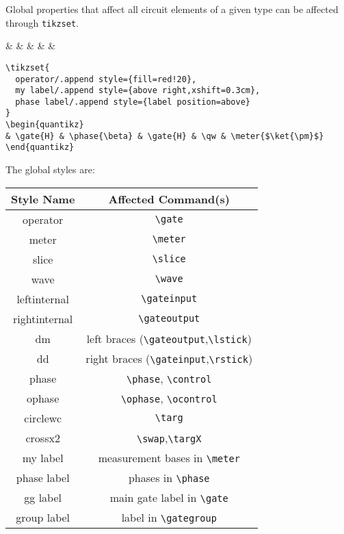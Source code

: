 \documentclass[aps,pra,10pt,nofootinbib]{revtex4}
\begin{document}
Global properties that affect all circuit elements of a given type can be affected through \verb!tikzset!.
\begin{Code}
\begin{center}
\begin{quantikz}
&  & \phase{\beta} &  & \qw & \meter{$\ket{\pm}$}
\end{quantikz}
\end{center}
\tcblower
\begin{lstlisting}
\tikzset{
  operator/.append style={fill=red!20},
  my label/.append style={above right,xshift=0.3cm},
  phase label/.append style={label position=above}
}
\begin{quantikz}
& \gate{H} & \phase{\beta} & \gate{H} & \qw & \meter{$\ket{\pm}$}
\end{quantikz}
\end{lstlisting}
\end{Code}
The global styles are:
\begin{center}
\begin{tabular}{c|c}
Style Name & Affected Command(s)	\\
\hline
operator & \verb!\gate!	\\
meter & \verb!\meter! \\
slice & \verb!\slice! \\
wave & \verb!\wave! \\
leftinternal	& \verb!\gateinput! \\
rightinternal	& \verb!\gateoutput! \\
dm & left braces (\verb!\gateoutput!,\verb!\lstick!) \\
dd & right braces (\verb!\gateinput!,\verb!\rstick!) \\
phase & \verb!\phase!, \verb!\control! \\
ophase & \verb!\ophase!, \verb!\ocontrol! \\
circlewc & \verb!\targ! \\
crossx2 & \verb!\swap!,\verb!\targX! \\
my label & measurement bases in \verb!\meter! \\
phase label & phases in \verb!\phase! \\
gg label & main gate label in \verb!\gate! \\
group label & label in \verb!\gategroup!
\end{tabular}
\end{center}
\end{document}
